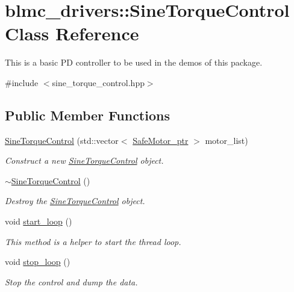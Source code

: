 \hypertarget{classblmc__drivers_1_1SineTorqueControl}{}\section{blmc\+\_\+drivers\+:\+:Sine\+Torque\+Control Class Reference}
\label{classblmc__drivers_1_1SineTorqueControl}


This is a basic PD controller to be used in the demos of this package.  




{\ttfamily \#include $<$sine\+\_\+torque\+\_\+control.\+hpp$>$}

\subsection*{Public Member Functions}
\begin{DoxyCompactItemize}
\item 
\hyperlink{classblmc__drivers_1_1SineTorqueControl_ab3fcdb73429a6e4a664dc294f80e6d3c}{Sine\+Torque\+Control} (std\+::vector$<$ \hyperlink{namespaceblmc__drivers_ab975c3be3c53a93a10c491f07a132e2b}{Safe\+Motor\+\_\+ptr} $>$ motor\+\_\+list)
\begin{DoxyCompactList}\small\item\em Construct a new \hyperlink{classblmc__drivers_1_1SineTorqueControl}{Sine\+Torque\+Control} object. \end{DoxyCompactList}\item 
\mbox{\label{classblmc__drivers_1_1SineTorqueControl_ae66565e4a8be3eb93d84f6dc0c825ce6}} 
\hyperlink{classblmc__drivers_1_1SineTorqueControl_ae66565e4a8be3eb93d84f6dc0c825ce6}{$\sim$\+Sine\+Torque\+Control} ()
\begin{DoxyCompactList}\small\item\em Destroy the \hyperlink{classblmc__drivers_1_1SineTorqueControl}{Sine\+Torque\+Control} object. \end{DoxyCompactList}\item 
\mbox{\label{classblmc__drivers_1_1SineTorqueControl_aa884278b4fc524c8e6d93b23630aa967}} 
void \hyperlink{classblmc__drivers_1_1SineTorqueControl_aa884278b4fc524c8e6d93b23630aa967}{start\+\_\+loop} ()
\begin{DoxyCompactList}\small\item\em This method is a helper to start the thread loop. \end{DoxyCompactList}\item 
\mbox{\label{classblmc__drivers_1_1SineTorqueControl_a1ecff8c52b3a8b0f6ece6818c42ec94a}} 
void \hyperlink{classblmc__drivers_1_1SineTorqueControl_a1ecff8c52b3a8b0f6ece6818c42ec94a}{stop\+\_\+loop} ()
\begin{DoxyCompactList}\small\item\em Stop the control and dump the data. \end{DoxyCompactList}\end{DoxyCompactItemize}
